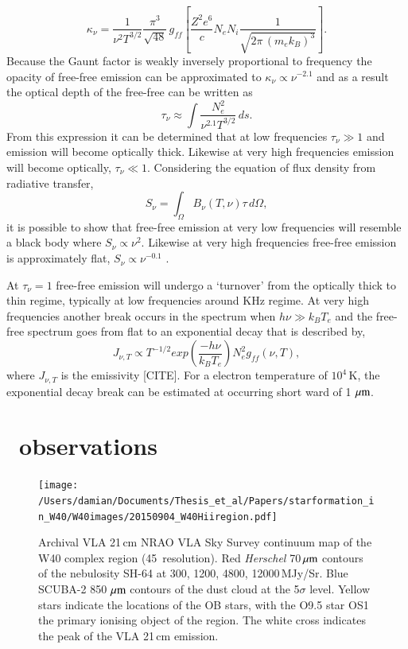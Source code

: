\begin{equation}
\kappa_\nu=\frac{1}{\nu^{2}T^{3/2}}\frac{\pi^{3}}{\sqrt{48}}\,g_{ff}\left [ \frac{Z^{2}e^{6}}{c}N_{e}N_{i}\frac{1}{\sqrt{2\pi\,(m_{e}k_{B})^{3}}} \right ].
\label{eqn:kappaff}
\end{equation}
Because the Gaunt factor is weakly inversely proportional to frequency the opacity of free-free emission can be approximated to $\kappa_\nu \propto \nu^{-2.1}$ \citep{Oster:1961fk, Altenhoff:1970ai} and as a result the optical depth of the free-free can be written as 
\begin{equation}
\tau_\nu \approx \int \frac{N_{e}^{2}}{\nu^{2.1}T^{3/2}}\,ds.
\label{eqn:Tauff}
\end{equation}
From this expression it can be determined that at low frequencies $\tau_\nu \gg 1$ and emission will become optically thick. Likewise at very high frequencies emission will become optically, $\tau_\nu \ll 1$. Considering the equation of flux density from radiative transfer, 
\begin{equation}
S_\nu= \int_{\Omega }B_{\nu}(T,\nu)\tau\,d\Omega, 
\label{eqn:Snu}
\end{equation}
it is possible to show that free-free emission at very low frequencies will resemble a black body where $S_\nu \propto \nu^{2}$. Likewise at very high frequencies free-free emission is approximately flat, $S_\nu \propto \nu^{-0.1}$ \citep{Mezger:1967fk}.

At $\tau_\nu = 1$ free-free emission will undergo a `turnover' from the optically thick to thin regime, typically at low frequencies around KHz regime.  At very high frequencies another break occurs in the spectrum when $h\nu \gg k_{B}T_{e}$ and the free-free spectrum goes from flat to an exponential decay that is described by, 
\begin{equation}
J_{\nu,T} \propto T^{-1/2}exp\left ( \frac{-h\nu}{k_{B}T_{e}}\right) N_{e}^{2} g_{ff}(\nu,T), 
\label{eqn:expdecay}
\end{equation}
where $J_{\nu,T}$ is the emissivity [CITE]. For a electron temperature of $10^{4}$\,K, the exponential decay break can be estimated at occurring short ward of 1\,$\,\mu\rm{m}$. 

\section{\HII\ observations}
\begin{figure}
\begin{centering}
\texttt{[image: /Users/damian/Documents/Thesis\_et\_al/Papers/starformation\_in\_W40/W40images/20150904\_W40Hiiregion.pdf]}
\caption{Archival VLA 21\,cm NRAO VLA Sky Survey \citep{Condon:1998kx} continuum map of the W40 complex \HII region (45\arcsec\ resolution). Red  \emph{Herschel} 70$\,\mu\rm{m}$ contours of the nebulosity SH-64 at 300, 1200, 4800, 12000\,MJy/Sr. Blue SCUBA-2 850\,$\,\mu\rm{m}$ 
contours of the dust cloud at the 5$\sigma$ level. Yellow stars indicate the locations of the OB stars, with the O9.5 star OS1 the primary ionising object of the region. The white cross indicates the peak of the VLA 21\,cm emission.} 
\label{fig:21cm}
\end{centering}
\end{figure} 

